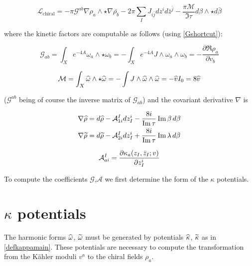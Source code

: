 \begin{equation}
	\mathcal{L}_\mathrm{chiral} = - \pi \mathcal{G}^{ab} \nabla \rho_a \wedge \star \nabla \bar {\rho_b} - 2 \pi \sum_I J_{i\bar j} dz^i d\bar{z}^{\bar j} - \frac{\pi\mathcal{M}}{\Im \tau} d\beta \wedge \star d\bar\beta
	\label{y20lagrangian}
\end{equation}

where the kinetic factors are computable as follows (using \eqref{Gshortcut}):

\begin{equation}
	\mathcal{G}_{ab} = \int_X e^{-4A} \omega_a \wedge \star \omega_b = - \int_X e^{-4A} J \wedge \omega_a \wedge \omega_b = - \frac{\partial \Re \rho_a}{\partial v_b}
	\label{}
\end{equation}

\begin{equation}
	\mathcal{M} = \int_X \widehat{\omega} \wedge \star \widehat{\omega} = - \int J \wedge \widehat{\omega} \wedge \widehat{\omega} = - \widehat{v} I_0 = 8 \widehat{v}
	\label{Mfinal}
\end{equation}

($\mathcal G^{ab}$ being of course the inverse matrix of $\mathcal G_{ab}$) and the covariant derivative $\nabla$ is

\begin{align}
	\nabla \widehat{\rho} &= d \widehat{\rho} - \mathcal{A}_{1i}^{I} dz_I^i - \frac{8i}{\operatorname{Im} \tau} \operatorname{Im} \beta \, d\beta\\
	\nabla \widetilde{\rho} &= d \widetilde{\rho} - \mathcal{A}_{2i}^{I} dz_I^i + \frac{8i}{\operatorname{Im} \tau} \operatorname{Im} \lambda \, d\beta
	\label{}
\end{align}

\begin{equation}
	\mathcal{A}_{ai}^I = \frac{\partial\kappa_a(z_I,\bar z_I; v)}{\partial z_I^i}
	\label{}
\end{equation}

To compute the coefficients $\mathcal{G}$,$\mathcal{A}$ we first determine the form of the $\kappa$ potentials.

\section{$\kappa$ potentials}

The harmonic forms $\widehat{\omega}$, $\widetilde{\omega}$ must be generated by potentials $\widehat{\kappa}$, $\widetilde{\kappa}$ as in \eqref{defkappamain}. These potentials are necessary to compute the transformation from the K\"ahler moduli $v^a$ to the chiral fields $\rho_a$.

